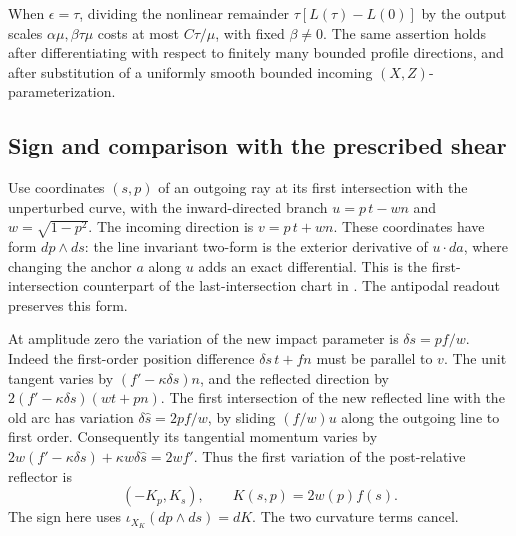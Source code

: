 \documentclass[11pt]{article}
\begin{document}
When \(\epsilon=\tau\), dividing the nonlinear remainder \(\tau[L(\tau)-L(0)]\)
by the output scales \(\alpha\mu,\beta\tau\mu\) costs at most \(C\tau/\mu\),
with fixed \(\beta\ne0\). The same assertion holds after differentiating with
respect to finitely many bounded profile directions, and after substitution of a
uniformly smooth bounded incoming \((X,Z)\)-parameterization.

\subsection{Sign and comparison with the prescribed
shear}\label{sign-and-comparison-with-the-prescribed-shear}

Use coordinates \((s,p)\) of an outgoing ray at its first intersection with the
unperturbed curve, with the inward-directed branch \(u=p\,t-w n\) and
\(w=\sqrt{1-p^2}\). The incoming direction is \(v=p\,t+w n\). These coordinates
have form \(dp\wedge ds\): the line invariant two-form is the exterior
derivative of \(u\cdot da\), where changing the anchor \(a\) along \(u\) adds an
exact differential. This is the first-intersection counterpart of the
last-intersection chart in \cite[\S1.4]{Glutsyuk}. The antipodal readout
preserves this form.

At amplitude zero the variation of the new impact parameter is
\(\delta s=pf/w\). Indeed the first-order position difference \(\delta s\,t+fn\)
must be parallel to \(v\). The unit tangent varies by \((f'-\kappa\delta s)n\),
and the reflected direction by \(2(f'-\kappa\delta s)(w t+p n)\). The first
intersection of the new reflected line with the old arc has variation
\(\delta\widehat s=2pf/w\), by sliding \((f/w)u\) along the outgoing line to
first order. Consequently its tangential momentum varies by
\(2w(f'-\kappa\delta s)+\kappa w\delta\widehat s=2w f'\). Thus the first
variation of the post-relative reflector is \[
 (-K_p,K_s),\qquad K(s,p)=2w(p)f(s).
\] The sign here uses \(\iota_{X_K}(dp\wedge ds)=dK\). The two curvature terms
cancel.
\end{document}
